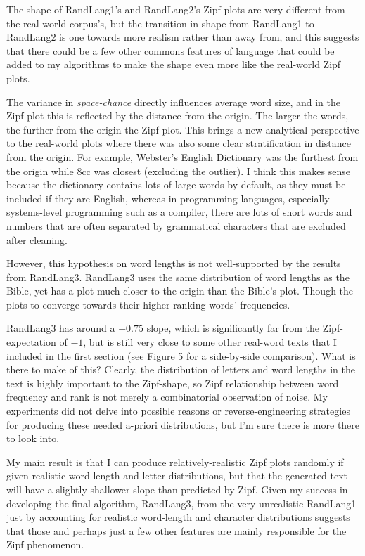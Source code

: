 \documentclass{article}
\begin{document}
The shape of RandLang1's and RandLang2's Zipf plots are very different from the real-world corpus's, but the transition in shape from RandLang1 to RandLang2 is one towards more realism rather than away from, and this suggests that there could be a few other commons features of language that could be added to my algorithms to make the shape even more like the real-world Zipf plots.



The variance in \textit{space-chance} directly influences average word size, and in the Zipf plot this is reflected by the distance from the origin. The larger the words, the further from the origin the Zipf plot. This brings a new analytical perspective to the real-world plots where there was also some clear stratification in distance from the origin. For example, Webster's English Dictionary was the furthest from the origin while 8cc was closest (excluding the outlier). I think this makes sense because the dictionary contains lots of large words by default, as they must be included if they are English, whereas in programming languages, especially systems-level programming such as a compiler, there are lots of short words and numbers that are often separated by grammatical characters that are excluded after cleaning.



However, this hypothesis on word lengths is not well-supported by the results from RandLang3. RandLang3 uses the same distribution of word lengths as the Bible, yet has a plot much closer to the origin than the Bible's plot. Though the plots to converge towards their higher ranking words' frequencies.



RandLang3 has around a $  -0.75  $ slope, which is significantly far from the Zipf-expectation of $  -1  $, but is still very close to some other real-word texts that I included in the first section (see Figure 5 for a side-by-side comparison). What is there to make of this? Clearly, the distribution of letters and word lengths in the text is highly important to the Zipf-shape, so Zipf relationship between word frequency and rank is not merely a combinatorial observation of noise. My experiments did not delve into possible reasons or reverse-engineering strategies for producing these needed a-priori distributions, but I'm sure there is more there to look into.



My main result is that I can produce relatively-realistic Zipf plots randomly if given realistic word-length and letter distributions, but that the generated text will have a slightly shallower slope than predicted by Zipf. Given my success in developing the final algorithm, RandLang3, from the very unrealistic RandLang1 just by accounting for realistic word-length and character distributions suggests that those and perhaps just a few other features are mainly responsible for the Zipf phenomenon.
\end{document}
